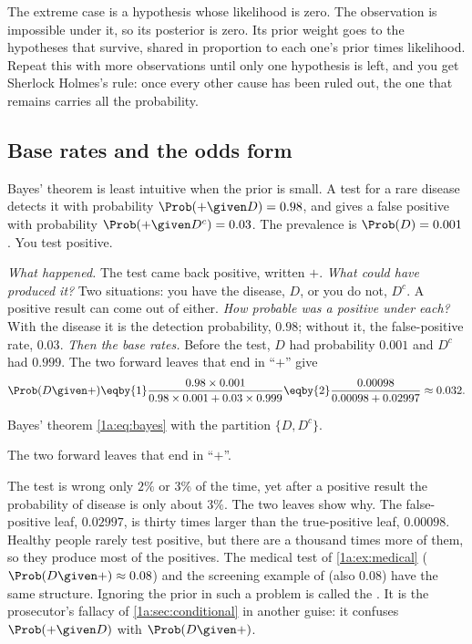The extreme case is a hypothesis whose likelihood is zero. The observation is
impossible under it, so its posterior is zero. Its prior weight goes to the
hypotheses that survive, shared in proportion to each one's prior times
likelihood. Repeat this with more observations until only one hypothesis is
left, and you get Sherlock Holmes's rule: once every other cause has been ruled
out, the one that remains carries all the probability.

\subsection{Base rates and the odds form}

Bayes' theorem is least intuitive when the prior is small. A test for a rare
disease detects it with probability $\Prob(+\given D)=0.98$, and gives a false
positive with probability $\Prob(+\given D^c)=0.03$. The prevalence is
$\Prob(D)=0.001$ . You test positive.

\emph{What happened.} The test came back positive, written $+$.
\emph{What could have produced it?} Two situations: you have the disease,
$D$, or you do not, $D^c$. A positive result can come out of either.
\emph{How probable was a positive under each?} With the disease it is the
detection probability, $0.98$; without it, the false-positive rate, $0.03$.
\emph{Then the base rates.} Before the test, $D$ had probability $0.001$ and
$D^c$ had $0.999$. The two forward leaves that end in ``$+$'' give
\begin{align*}
\Prob(D\given +)
\eqby{1}\frac{0.98\times0.001}{0.98\times0.001+0.03\times0.999}
\eqby{2}\frac{0.00098}{0.00098+0.02997}\approx0.032 .
\end{align*}
\begin{explain}
  \item Bayes' theorem \eqref{1a:eq:bayes} with the partition $\{D,D^c\}$.
  \item The two forward leaves that end in ``$+$''.
\end{explain}
The test is wrong only $2\%$ or $3\%$ of the time, yet after a positive result
the probability of disease is only about $3\%$. The two leaves show why. The
false-positive leaf, $0.02997$, is thirty times larger than the true-positive
leaf, $0.00098$. Healthy people rarely test positive, but there are a thousand
times more of them, so they produce most of the positives. The medical test of
\cref{1a:ex:medical}
($\Prob(D\given +)\approx0.08$) and the screening example of
 (also $0.08$) have the same structure. Ignoring the
prior in such a problem is called the . It is the
prosecutor's fallacy of \cref{1a:sec:conditional} in another guise: it
confuses $\Prob(+\given D)$ with $\Prob(D\given +)$.

